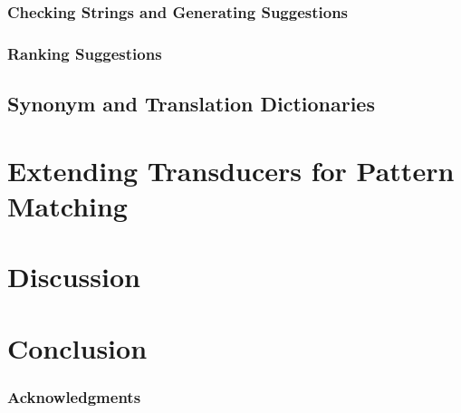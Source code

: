 \documentclass{llncs}
\begin{document}
\subsubsection{Checking Strings and Generating Suggestions}

\subsubsection{Ranking Suggestions}

\subsection{Synonym and Translation Dictionaries}

\section{Extending Transducers for Pattern Matching}

\section{Discussion}

\section{Conclusion}

\subsubsection*{Acknowledgments}



%
\end{document}
